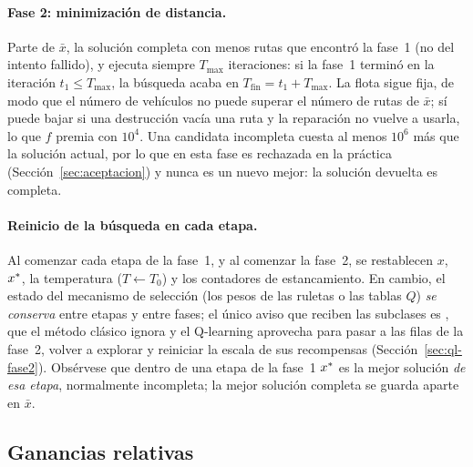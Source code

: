 \paragraph{Fase 2: minimización de distancia.} Parte de $\bar{x}$, la solución completa con
menos rutas que encontró la fase~1 (no del intento fallido), y ejecuta siempre $T_{\max}$
iteraciones: si la fase~1 terminó en la iteración $t_1\le T_{\max}$, la búsqueda acaba en
$T_{\mathrm{fin}}=t_1+T_{\max}$. La flota sigue fija, de modo que el número de vehículos no
puede superar el número de rutas de $\bar{x}$; sí puede bajar si una destrucción vacía una
ruta y la reparación no vuelve a usarla, lo que $f$ premia con $10^4$. Una candidata
incompleta cuesta al menos $10^6$ más que la solución actual, por lo que en esta fase es
rechazada en la práctica (Sección~\ref{sec:aceptacion}) y nunca es un nuevo mejor: la solución
devuelta es completa.

\paragraph{Reinicio de la búsqueda en cada etapa.} Al comenzar cada etapa de la fase~1, y al
comenzar la fase~2, se restablecen $x$, $x^{*}$, la temperatura ($T\gets T_0$) y los
contadores de estancamiento. En cambio, el estado del mecanismo de selección (los pesos de
las ruletas o las tablas $Q$) \emph{se conserva} entre etapas y entre fases; el único aviso que
reciben las subclases es , que el método clásico ignora y el Q-learning
aprovecha para pasar a las filas de la fase~2, volver a explorar y reiniciar la escala de sus
recompensas (Sección~\ref{sec:ql-fase2}). Obsérvese que dentro de una
etapa de la fase~1 $x^{*}$ es la mejor solución \emph{de esa etapa}, normalmente incompleta;
la mejor solución completa se guarda aparte en $\bar{x}$.

\subsection{Ganancias relativas}
\label{sec:ganancia}

